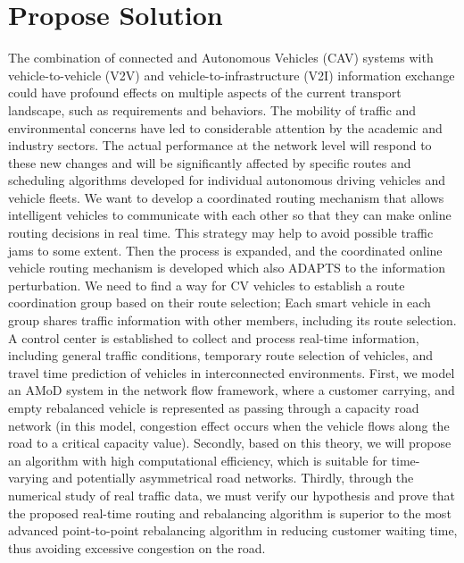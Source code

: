 \documentclass[letterpaper,10pt,draftclsnofoot,onecolumn]{IEEEtran}
\begin{document}
\section{Propose Solution}
The combination of connected and Autonomous Vehicles (CAV) systems with vehicle-to-vehicle (V2V) and vehicle-to-infrastructure (V2I) information exchange could have profound effects on multiple aspects of the current transport landscape, such as requirements and behaviors. The mobility of traffic and environmental concerns have led to considerable attention by the academic and industry sectors. The actual performance at the network level will respond to these new changes and will be significantly affected by specific routes and scheduling algorithms developed for individual autonomous driving vehicles and vehicle fleets. We want to develop a coordinated routing mechanism that allows intelligent vehicles to communicate with each other so that they can make online routing decisions in real time. This strategy may help to avoid possible traffic jams to some extent. Then the process is expanded, and the coordinated online vehicle routing mechanism is developed which also ADAPTS to the information perturbation. We need to find a way for CV vehicles to establish a route coordination group based on their route selection; Each smart vehicle in each group shares traffic information with other members, including its route selection. A control center is established to collect and process real-time information, including general traffic conditions, temporary route selection of vehicles, and travel time prediction of vehicles in interconnected environments. First, we model an AMoD system in the network flow framework, where a customer carrying, and empty rebalanced vehicle is represented as passing through a capacity road network (in this model, congestion effect occurs when the vehicle flows along the road to a critical capacity value). Secondly, based on this theory, we will propose an algorithm with high computational efficiency, which is suitable for time-varying and potentially asymmetrical road networks. Thirdly, through the numerical study of real traffic data, we must verify our hypothesis and prove that the proposed real-time routing and rebalancing algorithm is superior to the most advanced point-to-point rebalancing algorithm in reducing customer waiting time, thus avoiding excessive congestion on the road.
\end{document}
